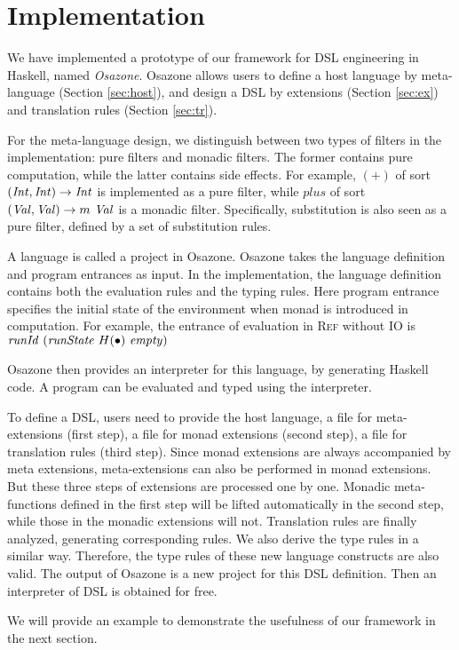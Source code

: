 \section{Implementation}\label{sec:impl}

We have implemented a prototype of our framework for DSL engineering in Haskell, named \textit{Osazone}.
Osazone allows users to define a host language by meta-language (Section \ref{sec:host}),
 and design a DSL by extensions (Section \ref{sec:ex}) and translation rules (Section \ref{sec:tr}).

For the meta-language design, we distinguish between two types of filters in the implementation:
 pure filters and monadic filters.
The former contains pure computation, while the latter contains side effects.
For example, $(+)$ of sort $(\mathit{Int},\mathit{Int})->\mathit{Int}$ is implemented as a pure filter,
 while $plus$ of sort $(\mathit{Val},\mathit{Val})->m~\mathit{Val}$ is a monadic filter.
Specifically, substitution is also seen as a pure filter, defined by a set of substitution rules.

A language is called a project in Osazone.
Osazone takes the language definition and program entrances as input.
In the implementation, the language definition contains both the evaluation rules and the typing rules.
Here program entrance specifies the initial state of the environment when monad is introduced in computation.
For example, the entrance of evaluation in \textsc{Ref} without IO is 
$\mathit{runId}~(\mathit{runState}~H(\bullet)~\mathit{empty})$

Osazone then provides an interpreter for this language, by generating Haskell code.
A program can be evaluated and typed using the interpreter.

To define a DSL, users need to provide the host language, 
  a file for meta-extensions (first step), 
  a file for monad extensions (second step),
  a file for translation rules (third step).
Since monad extensions are always accompanied by meta extensions,
 meta-extensions can also be performed in monad extensions.
But these three steps of extensions are processed one by one.
Monadic meta-functions defined in the first step will be lifted automatically in the second step,
 while those in the monadic extensions will not.
Translation rules are finally analyzed, generating corresponding rules.
We also derive the type rules in a similar way.
Therefore, the type rules of these new language constructs are also valid.
The output of Osazone is a new project for this DSL definition.
Then an interpreter of DSL is obtained for free.

We will provide an example to demonstrate the usefulness of our framework in the next section.
